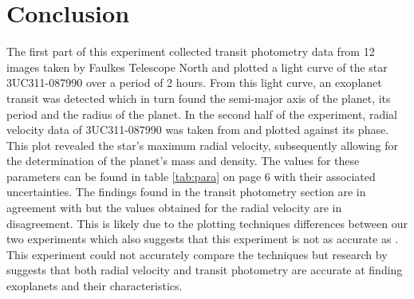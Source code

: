 \documentclass[10pt]{article}
\begin{document}
\section{Conclusion}

The first part of this experiment collected transit photometry data from 12 images taken by Faulkes Telescope North and plotted a light curve of the star 3UC311-087990 over a period of 2 hours. From this light curve, an exoplanet transit was detected which in turn found the semi-major axis of the planet, its period and the radius of the planet. In the second half of the experiment, radial velocity data of 3UC311-087990 was taken from \cite{Alsubai_2011} and plotted against its phase. This plot revealed the star's maximum radial velocity, subsequently allowing for the determination of the planet's mass and density. The values for these parameters can be found in table \ref{tab:para} on page 6 with their associated uncertainties. The findings found in the transit photometry section are in agreement with \cite{Alsubai_2011} but the values obtained for the radial velocity are in disagreement. This is likely due to the plotting techniques differences between our two experiments which also suggests that this experiment is not as accurate as \cite{Alsubai_2011}. This experiment could not accurately compare the techniques but research by \cite{Burke_2014} suggests that both radial velocity and transit photometry are accurate at finding exoplanets and their characteristics.



\end{document}
